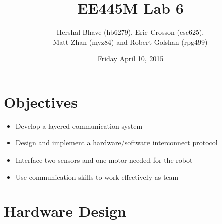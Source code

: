 \documentclass[12pt]{article}
\title{EE445M Lab 6}
\author{Hershal Bhave (hb6279), Eric Crosson (esc625), \\
  Matt Zhan (myz84) and Robert Golshan (rpg499)}
\date{Friday April 10, 2015}
\begin{document}
\maketitle

\section{Objectives}

\begin{itemize}
\item Develop a layered communication system
\item Design and implement a hardware/software interconnect protocol
\item Interface two sensors and one motor needed for the robot
\item Use communication skills to work effectively as team
\end{itemize}

\section{Hardware Design}
\end{document}
